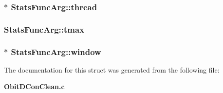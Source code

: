 \subsubsection{$\ast$ {\bf Stats\-Func\-Arg::thread}}\label{structStatsFuncArg_o6}


\subsubsection{ {\bf Stats\-Func\-Arg::tmax}}\label{structStatsFuncArg_o9}


\subsubsection{$\ast$ {\bf Stats\-Func\-Arg::window}}\label{structStatsFuncArg_o1}




The documentation for this struct was generated from the following file:\begin{CompactItemize}
\item 
{\bf Obit\-DCon\-Clean.c}\end{CompactItemize}
